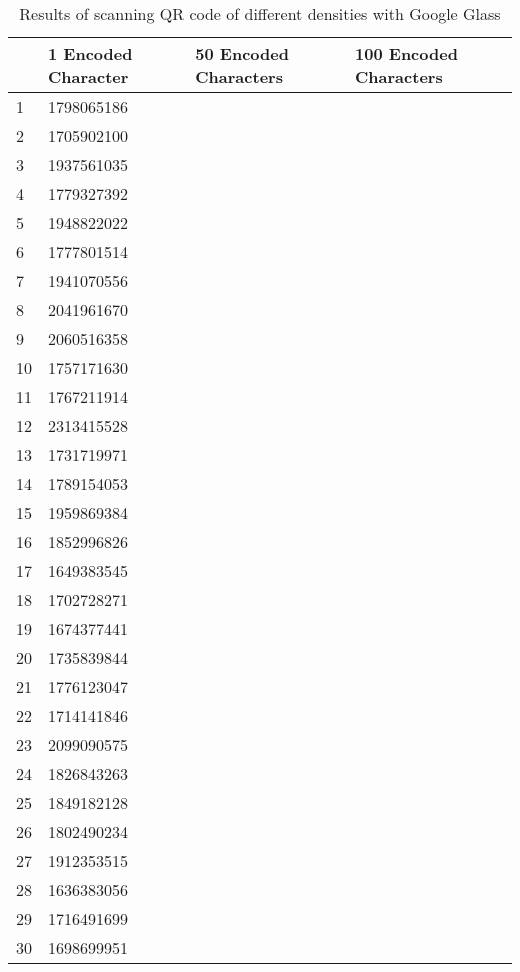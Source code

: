 	\begin{table}[ht!]
    		\caption{Results of scanning QR code of different densities with Google Glass} \label{tab:distamceSmartphoneFull}
		\centering \begin{tabularx}{\textwidth}{l|X|X|X} \hline
		& \textbf{1 Encoded Character} & \textbf{50 Encoded Characters} & \textbf{100 Encoded Characters} \\ \hline \hline

		1&	1798065186	&		&		\\ \hline
		2&	1705902100	&		&		\\ \hline
		3&	1937561035	&		&		\\ \hline
		4&	1779327392	&		&		\\ \hline
		5&	1948822022	&		&		\\ \hline
		6&	1777801514	&		&		\\ \hline
		7&	1941070556	&		&		\\ \hline
		8&	2041961670	&		&		\\ \hline
		9&	2060516358	&		&		\\ \hline
		10&	1757171630	&		&		\\ \hline
		11&	1767211914	&		&		\\ \hline
		12&	2313415528	&		&		\\ \hline
		13&	1731719971	&		&		\\ \hline
		14&	1789154053	&		&		\\ \hline
		15&	1959869384	&		&		\\ \hline
		16&	1852996826	&		&		\\ \hline
		17&	1649383545	&		&		\\ \hline
		18&	1702728271	&		&		\\ \hline
		19&	1674377441	&		&		\\ \hline
		20&	1735839844	&		&		\\ \hline
		21&	1776123047	&		&		\\ \hline
		22&	1714141846	&		&		\\ \hline
		23&	2099090575	&		&		\\ \hline
		24&	1826843263	&		&		\\ \hline
		25&	1849182128	&		&		\\ \hline
		26&	1802490234	&		&		\\ \hline
		27&	1912353515	&		&		\\ \hline
		28&	1636383056	&		&		\\ \hline
		29&	1716491699	&		&		\\ \hline
		30&	1698699951	&		&		\\ \hline
		
		\end{tabularx}
	\end{table}

